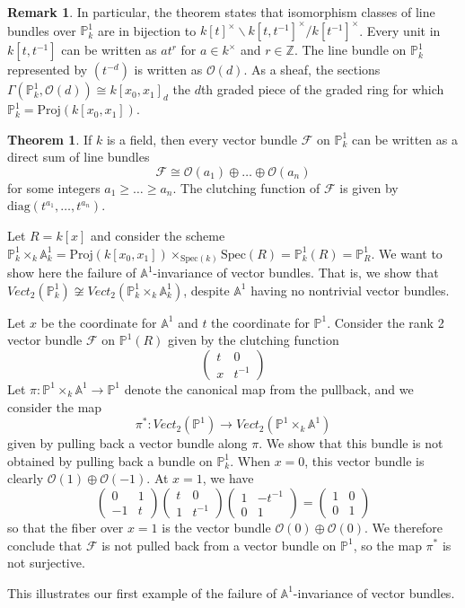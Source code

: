 \documentclass[letterpaper,10pt,twoside]{amsart}
\theoremstyle{proposition}
\theoremstyle{definition}
\theoremstyle{theorem}
\newtheorem{theorem}[proposition]{Theorem}
\theoremstyle{definition}
\newtheorem{remark}[proposition]{\textbf{Remark}}
\theoremstyle{definition}
\theoremstyle{definition}
\theoremstyle{lemma}
\theoremstyle{definition}
\theoremstyle{definition}
\theoremstyle{corollary}
\theoremstyle{definition}
\def\Spec{\text{Spec}}
\def\O{\mathcal{O}}
\def\Proj{\text{Proj}}
\def\P{\mathbb{P}}
\def\A{\mathbb{A}}
\def\F{\mathcal{F}}
\begin{document}
\begin{remark}
    In particular, the theorem states that isomorphism classes of line bundles over $\P^1_k$ are in bijection to $k[t]^\times\backslash k[t,t^{-1}]^\times /k[t^{-1}]^\times$. Every unit in $k[t,t^{-1}]$ can be written as $at^r$ for $a\in k^\times$ and $r\in\mathbb{Z}$. The line bundle on $\P^1_k$ represented by $(t^{-d})$ is written as $\O(d)$. As a sheaf, the sections $\Gamma(\P^1_k,\O(d))\cong k[x_0,x_1]_d$ the $d$th graded piece of the graded ring for which $\P^1_k=\Proj(k[x_0,x_1])$. 
\end{remark}

\begin{theorem}\cite{1}
    If $k$ is a field, then every vector bundle $\F$ on $\P^1_k$ can be written as a direct sum of line bundles \[\F\cong \O(a_1)\oplus\dots\oplus \O(a_n)\] for some integers $a_1\geq\dots\geq a_n$. The clutching function of $\F$ is given by $\text{diag}(t^{a_1},\dots,t^{a_n})$.
\end{theorem}

Let $R=k[x]$ and consider the scheme $\P^1_k\times_k \A^1_k = \Proj(k[x_0,x_1])\times_{\Spec(k)}\Spec(R) = \P^1_k(R) = \P^1_R$. We want to show here the failure of $\A^1$-invariance of vector bundles. That is, we show that $Vect_2(\P^1_k)\not\cong Vect_2(\P^1_k\times_k \A^1_k)$, despite $\A^1$ having no nontrivial vector bundles.

Let $x$ be the coordinate for $\A^1$ and $t$ the coordinate for $\P^1$. Consider the rank 2 vector bundle $\F$ on $\P^1(R)$ given by the clutching function \[\begin{pmatrix} t & 0 \\ x & t^{-1} \end{pmatrix}\] Let $\pi:\P^1\times_k\A^1\to \P^1$ denote the canonical map from the pullback, and we consider the map \[\pi^*:Vect_2(\P^1)\to Vect_2(\P^1\times_k \A^1)\] given by pulling back a vector bundle along $\pi$. We show that this bundle is not obtained by pulling back a bundle on $\P^1_k$. When $x=0$, this vector bundle is clearly $\O(1)\oplus \O(-1)$. At $x=1$, we have \[\begin{pmatrix} 0 & 1 \\ -1 & t \end{pmatrix}\begin{pmatrix} t & 0 \\ 1 & t^{-1} \end{pmatrix}\begin{pmatrix} 1 & -t^{-1} \\ 0 & 1 \end{pmatrix} = \begin{pmatrix} 1 & 0 \\ 0 & 1 \end{pmatrix}\] so that the fiber over $x=1$ is the vector bundle $\O(0)\oplus \O(0)$. We therefore conclude that $\F$ is not pulled back from a vector bundle on $\P^1$, so the map $\pi^*$ is not surjective. 

This illustrates our first example of the failure of $\A^1$-invariance of vector bundles.

{}

\end{document}

